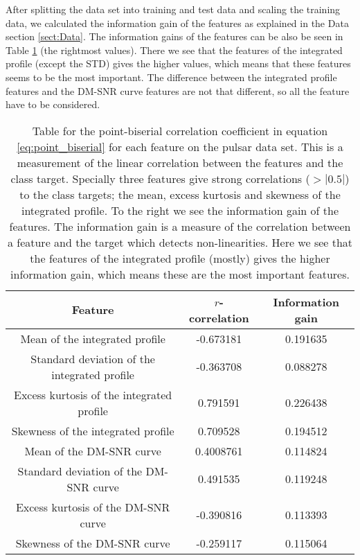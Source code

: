 \documentclass[12pt,a4paper,english]{article}
\begin{document}
After splitting the data set into training and test data and scaling the training data, we calculated the information gain of the features as explained in the Data section \ref{sect:Data}. The information gains of the features can be also be seen in Table \ref{tab:correlations} (the rightmost values). There we see that the features of the integrated profile (except the STD) gives the higher values, which means that these features seems to be the most important. The difference between the integrated profile features and the DM-SNR curve features are not that different, so all the feature have to be considered.

\begin{table}[htbp!]
	\centering
	\begin{tabular}{ |c|c|c| }
		\hline \rule{0pt}{13pt}
		Feature & $r$-correlation & Information gain \\
		\hline \rule{0pt}{13pt}
		Mean of the integrated profile & -0.673181 & 0.191635 \\
		\hline \rule{0pt}{13pt}
		Standard deviation of the integrated profile & -0.363708 & 0.088278 \\
		\hline \rule{0pt}{13pt}
		Excess kurtosis of the integrated profile & 0.791591 & 0.226438 \\
		\hline \rule{0pt}{13pt}
		Skewness of the integrated profile & 0.709528 & 0.194512 \\
		\hline \rule{0pt}{13pt}
		Mean of the DM-SNR curve & 0.4008761 & 0.114824 \\
		\hline \rule{0pt}{13pt}
		Standard deviation of the DM-SNR curve & 0.491535 & 0.119248 \\
		\hline \rule{0pt}{13pt}
		Excess kurtosis of the DM-SNR curve & -0.390816 & 0.113393 \\
		\hline \rule{0pt}{13pt}
		Skewness of the DM-SNR curve & -0.259117 &0.115064 \\
		\hline
	\end{tabular}	
	\caption{Table for the point-biserial correlation coefficient in equation \ref{eq:point_biserial} for each feature on the pulsar data set. This is a measurement of the linear correlation between the features and the class target. Specially three features give strong correlations ($>|0.5|$) to the class targets; the mean, excess kurtosis and skewness of the integrated profile. To the right we see the information gain of the features. The information gain is a measure of the correlation between a feature and the target which detects non-linearities. Here we see that the features of the integrated profile (mostly) gives the higher information gain, which means these are the most important features. \label{tab:correlations}}
\end{table}
\end{document}
